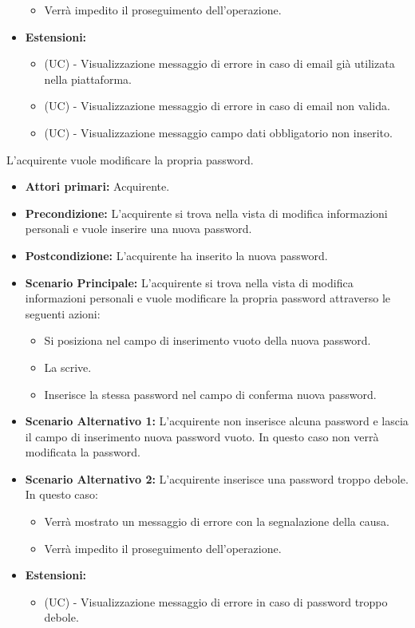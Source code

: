 \begin{itemize}
\begin{itemize}
        \item Verrà impedito il proseguimento dell'operazione.
    \end{itemize}
    \item \textbf{Estensioni:}
    \begin{itemize}
        \item (UC) - Visualizzazione messaggio di errore in caso di email già utilizata nella piattaforma.
        \item (UC) - Visualizzazione messaggio di errore in caso di email non valida.
        \item (UC) - Visualizzazione messaggio campo dati obbligatorio non inserito.
    \end{itemize}
\end{itemize}

L'acquirente vuole modificare la propria password.
\begin{itemize}
    \item \textbf{Attori primari:} Acquirente.
    \item \textbf{Precondizione:} L'acquirente si trova nella vista di modifica informazioni personali e vuole inserire una nuova password.
    \item \textbf{Postcondizione:} L'acquirente ha inserito la nuova password.
    \item \textbf{Scenario Principale:} L'acquirente si trova nella vista di modifica informazioni personali e vuole modificare la propria password attraverso le seguenti azioni:
        \begin{itemize}
            \item Si posiziona nel campo di inserimento vuoto della nuova password.
            \item La scrive.
            \item Inserisce la stessa password nel campo di conferma nuova password.
        \end{itemize}
    \item \textbf{Scenario Alternativo 1:} L'acquirente non inserisce alcuna password e lascia il campo di inserimento nuova password vuoto. In questo caso non verrà modificata la password.
    \item \textbf{Scenario Alternativo 2:} L'acquirente inserisce una password troppo debole. In questo caso:
    \begin{itemize}
        \item Verrà mostrato un messaggio di errore con la segnalazione della causa.
        \item Verrà impedito il proseguimento dell'operazione.
    \end{itemize}
    \item \textbf{Estensioni:}
    \begin{itemize}
        \item (UC) - Visualizzazione messaggio di errore in caso di password troppo debole.
    \end{itemize}
\end{itemize}

